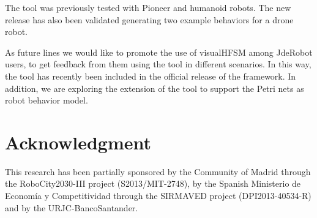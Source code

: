 \documentclass[journal,twoside]{JoPhA}
\begin{document}
The tool was previously tested with Pioneer and humanoid robots. The new release has also been validated generating two example behaviors for a drone robot. 

As future lines we would like to promote the use of visualHFSM among JdeRobot users, to get feedback from them using the tool in different scenarios. In this way, the tool has recently been included in the official release of the framework. In addition, we are exploring the extension of the tool to support the Petri nets as robot behavior model.

\section*{Acknowledgment}
This  research  has  been  partially  sponsored  by  the Community of Madrid through the RoboCity2030-III project (S2013/MIT-2748), by the Spanish Ministerio de Economía y Competitividad through the SIRMAVED project (DPI2013-40534-R) and by the URJC-BancoSantander.
\end{document}
